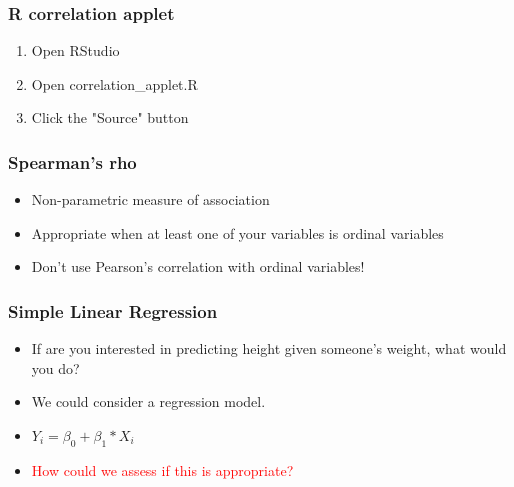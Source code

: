 \documentclass[dvipsnames]{beamer}\usepackage[]{graphicx}\usepackage[]{color}
\begin{document}
\begin{frame}
\frametitle{R correlation applet}
\begin{enumerate}
\item Open RStudio 
\item Open correlation\_applet.R
\item Click the "Source" button
\end{enumerate}
\end{frame}

\begin{frame}
\frametitle{Spearman's rho}
\begin{itemize}
\item Non-parametric measure of association
\item Appropriate when at least one of your variables is ordinal variables
\item Don't use Pearson's correlation with ordinal variables!
\end{itemize}
\end{frame}

\begin{frame}
\frametitle{Simple Linear Regression}
\begin{itemize}
    \item<1-> If are you interested in predicting height given someone's weight, what would you do?
  \item<2-> We could consider a regression model.
  \item<3-> $Y_i = \beta_0 + \beta_1 * X_i$
  \item<4->  \textcolor{red}{How could we assess if this is appropriate?}
\end{itemize}
\end{frame}
\end{document}
